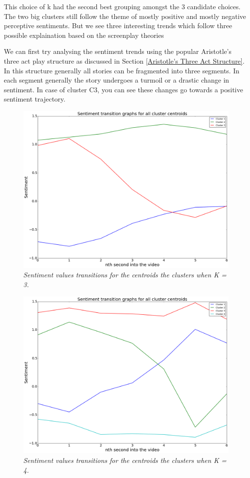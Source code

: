 {This choice of k had the second best grouping amongst the 3 candidate choices. The two big clusters still follow the theme of mostly positive and mostly negative perceptive sentiments. But we see three interesting trends which follow three possible explaination based on the screenplay theories 
\par
We can first try analysing the sentiment trends using the popular Aristotle's three act play structure as discussed in Section \ref{Aristotle's Three Act Structure}. In this structure generally all stories can be fragmented into three segments. In each segment generally the story undergoes a turmoil or a drastic change in sentiment. In case of cluster C3, you can see these changes go towards a positive sentiment trajectory. 
}
\begin{figure}
\centering
\includegraphics[width=\columnwidth]{plots/3_clusters_transitions}
\caption{\textsl{Sentiment values transitions for the centroids the clusters when K = 3.}}
\label{fig:3_clusters}
\end{figure}

\begin{figure}
\centering
\includegraphics[width=\columnwidth]{plots/4_clusters_transitions}
\caption{\textsl{Sentiment values transitions for the centroids the clusters when K = 4.}}
\label{fig:4_clusters}
\end{figure}

